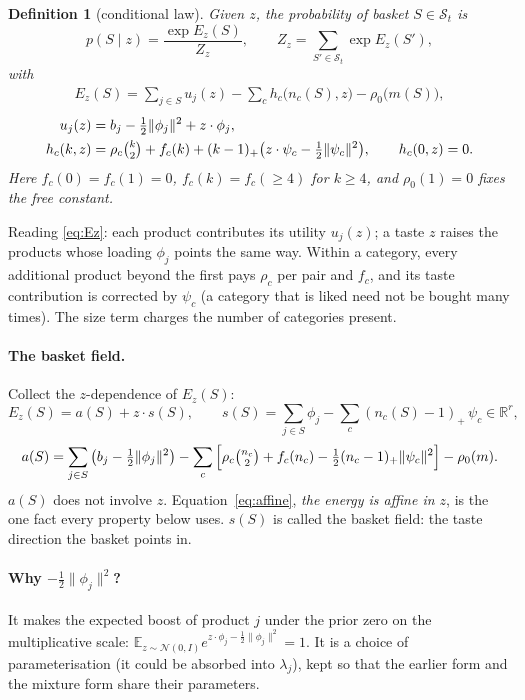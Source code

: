 \documentclass[11pt,a4paper]{article}
\newtheorem{definition}{Definition}
\theoremstyle{remark}
\newcommand{\N}{\mathcal N}
\newcommand{\E}{\mathbb E}
\newcommand{\R}{\mathbb R}
\newcommand{\pos}[1]{(#1)_+}
\begin{document}
\begin{definition}[conditional law]
Given $z$, the probability of basket $S\in\mathcal S_t$ is
\begin{equation}
p(S\mid z)=\frac{\exp E_z(S)}{Z_z},\qquad Z_z=\sum_{S'\in\mathcal S_t}\exp E_z(S'),
\label{eq:cond}
\end{equation}
with
\begin{align}
E_z(S)=\sum_{j\in S}u_j(z)
-\sum_{c}h_c\big(n_c(S),z\big)-\rho_0\big(m(S)\big),
\label{eq:Ez}
\end{align}
\begin{align}
u_j(z)&=b_j-\tfrac12\lVert\phi_j\rVert^2+z\cdot\phi_j, \label{eq:u}\\
h_c(k,z)&=\rho_c\tbinom{k}{2}+f_c(k)+\pos{k-1}\big(z\cdot\psi_c-\tfrac12\lVert\psi_c\rVert^2\big),
\qquad h_c(0,z)=0. \label{eq:h}
\end{align}
Here $f_c(0)=f_c(1)=0$, $f_c(k)=f_c(\ge4)$ for $k\ge4$, and $\rho_0(1)=0$ fixes the free constant.
\end{definition}

Reading \eqref{eq:Ez}: each product contributes its utility $u_j(z)$; a taste $z$ raises the products whose
loading $\phi_j$ points the same way. Within a category, every additional product beyond the first pays
$\rho_c$ per pair and $f_c$, and its taste contribution is corrected by $\psi_c$ (a category that is liked
need not be bought many times). The size term charges the number of categories present.

\paragraph{The basket field.} Collect the $z$-dependence of $E_z(S)$:
\begin{equation}
E_z(S)=a(S)+z\cdot s(S),\qquad
s(S)=\sum_{j\in S}\phi_j-\sum_c\pos{n_c(S)-1}\,\psi_c\in\R^r,
\label{eq:affine}
\end{equation}
\[
a(S)=\sum_{j\in S}\big(b_j-\tfrac12\lVert\phi_j\rVert^2\big)-\sum_c\Big[\rho_c\tbinom{n_c}{2}+f_c(n_c)
-\tfrac12\pos{n_c-1}\lVert\psi_c\rVert^2\Big]-\rho_0(m).
\]
$a(S)$ does not involve $z$. Equation~\eqref{eq:affine}, \emph{the energy is affine in $z$}, is the one fact
every property below uses. $s(S)$ is called the basket field: the taste direction the basket points in.

\paragraph{Why $-\tfrac12\lVert\phi_j\rVert^2$?} It makes the expected boost of product $j$ under the prior
zero on the multiplicative scale: $\E_{z\sim\N(0,I)}e^{z\cdot\phi_j-\frac12\lVert\phi_j\rVert^2}=1$. It is a
choice of parameterisation (it could be absorbed into $\lambda_j$), kept so that the earlier form and the
mixture form share their parameters.
\end{document}

